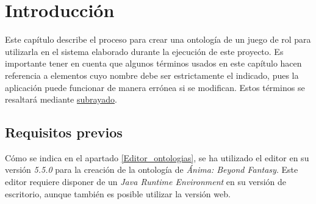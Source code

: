 
\section{Introducción}
Este capítulo describe el proceso para crear una ontología de un juego de rol para utilizarla en el sistema 
elaborado durante la ejecución de este proyecto. Es importante tener en cuenta que algunos términos usados 
en este capítulo hacen referencia a elementos cuyo nombre debe ser estrictamente el indicado, pues la aplicación 
puede funcionar de manera errónea si se modifican. Estos términos se resaltará mediante \underline{subrayado}.

\subsection{Requisitos previos}
Cómo se indica en el apartado \ref*{Editor_ontologias}, se ha utilizado el editor \protege en su versión 
\textit{5.5.0} para la creación de la ontología de \textit{Ánima: Beyond Fantasy}. Este editor requiere disponer 
de un \textit{Java Runtime Environment} en su versión de escritorio, aunque también es posible utilizar la versión 
web.


